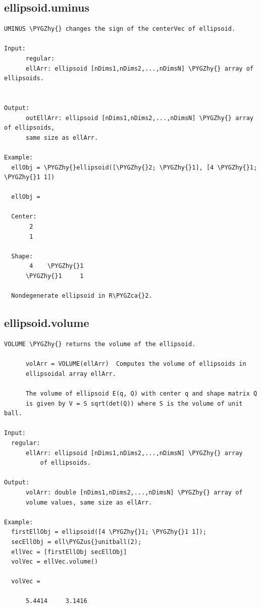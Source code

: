 \documentclass[letterpaper,10pt,english]{sphinxmanual}
\def\PYGZus{\char`\_}
\def\PYGZca{\char`\^}
\def\PYGZhy{\char`\-}
\begin{document}
\subsection{ellipsoid.uminus}
\label{chap_functions:ellipsoid-uminus}
\begin{Verbatim}[commandchars=\\\{\}]
UMINUS \PYGZhy{} changes the sign of the centerVec of ellipsoid.

Input:
      regular:
      ellArr: ellipsoid [nDims1,nDims2,...,nDimsN] \PYGZhy{} array of ellipsoids.


Output:
      outEllArr: ellipsoid [nDims1,nDims2,...,nDimsN] \PYGZhy{} array of ellipsoids,
      same size as ellArr.

Example:
  ellObj = \PYGZhy{}ellipsoid([\PYGZhy{}2; \PYGZhy{}1], [4 \PYGZhy{}1; \PYGZhy{}1 1])

  ellObj =

  Center:
       2
       1

  Shape:
       4    \PYGZhy{}1
      \PYGZhy{}1     1

  Nondegenerate ellipsoid in R\PYGZca{}2.
\end{Verbatim}


\subsection{ellipsoid.volume}
\label{chap_functions:ellipsoid-volume}
\begin{Verbatim}[commandchars=\\\{\}]
VOLUME \PYGZhy{} returns the volume of the ellipsoid.

      volArr = VOLUME(ellArr)  Computes the volume of ellipsoids in
      ellipsoidal array ellArr.

      The volume of ellipsoid E(q, Q) with center q and shape matrix Q
      is given by V = S sqrt(det(Q)) where S is the volume of unit ball.

Input:
  regular:
      ellArr: ellipsoid [nDims1,nDims2,...,nDimsN] \PYGZhy{} array
          of ellipsoids.

Output:
      volArr: double [nDims1,nDims2,...,nDimsN] \PYGZhy{} array of
      volume values, same size as ellArr.

Example:
  firstEllObj = ellipsoid([4 \PYGZhy{}1; \PYGZhy{}1 1]);
  secEllObj = ell\PYGZus{}unitball(2);
  ellVec = [firstEllObj secEllObj]
  volVec = ellVec.volume()

  volVec =

      5.4414     3.1416
\end{Verbatim}
\end{document}

